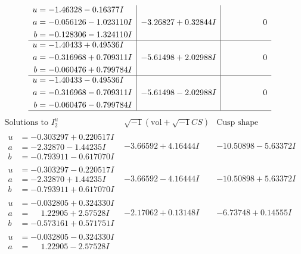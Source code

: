 \documentclass[1p]{elsarticle_modified}
\theoremstyle{definition}
\newcommand{\I}{\sqrt{-1}}
\begin{document}
$$\begin{array}{c|c|c}
\begin{aligned}
u &= -1.46328 - 0.16377 I \\
a &= -0.056126 - 1.023110 I \\
b &= -0.128306 - 1.324110 I\end{aligned}
 & -3.26827 + 0.32844 I & \phantom{-0.000000 } 0 \\ \hline\begin{aligned}
u &= -1.40433 + 0.49536 I \\
a &= -0.316968 + 0.709311 I \\
b &= -0.060476 + 0.799784 I\end{aligned}
 & -5.61498 + 2.02988 I & \phantom{-0.000000 } 0 \\ \hline\begin{aligned}
u &= -1.40433 - 0.49536 I \\
a &= -0.316968 - 0.709311 I \\
b &= -0.060476 - 0.799784 I\end{aligned}
 & -5.61498 - 2.02988 I & \phantom{-0.000000 } 0\\
 \hline 
 \end{array}$$\newpage$$\begin{array}{c|c|c}  
\text{Solutions to }I^u_{2}& \I (\text{vol} + \sqrt{-1}CS) & \text{Cusp shape}\\
 \hline 
\begin{aligned}
u &= -0.303297 + 0.220517 I \\
a &= -2.32870 - 1.44235 I \\
b &= -0.793911 - 0.617070 I\end{aligned}
 & -3.66592 + 4.16444 I & -10.50898 - 5.63372 I \\ \hline\begin{aligned}
u &= -0.303297 - 0.220517 I \\
a &= -2.32870 + 1.44235 I \\
b &= -0.793911 + 0.617070 I\end{aligned}
 & -3.66592 - 4.16444 I & -10.50898 + 5.63372 I \\ \hline\begin{aligned}
u &= -0.032805 + 0.324330 I \\
a &= \phantom{-}1.22905 + 2.57528 I \\
b &= -0.573161 + 0.571751 I\end{aligned}
 & -2.17062 + 0.13148 I & -6.73748 + 0.14555 I \\ \hline\begin{aligned}
u &= -0.032805 - 0.324330 I \\
a &= \phantom{-}1.22905 - 2.57528 I \\

\end{aligned}
\end{array}$$
\end{document}
